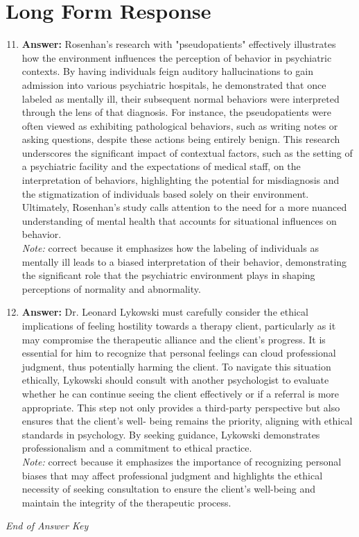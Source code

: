 \documentclass[12pt]{article}
\begin{document}
\section*{Long Form Response}
\begin{enumerate}[label=\arabic*.]
\setcounter{enumi}{10}
\item \textbf{Answer:} Rosenhan's research with "pseudopatients" effectively illustrates how the environment influences the perception of behavior in psychiatric contexts. By having individuals feign auditory hallucinations to gain admission into various psychiatric hospitals, he demonstrated that once labeled as mentally ill, their subsequent normal behaviors were interpreted through the lens of that diagnosis. For instance, the pseudopatients were often viewed as exhibiting pathological behaviors, such as writing notes or asking questions, despite these actions being entirely benign. This research underscores the significant impact of contextual factors, such as the setting of a psychiatric facility and the expectations of medical staff, on the interpretation of behaviors, highlighting the potential for misdiagnosis and the stigmatization of individuals based solely on their environment. Ultimately, Rosenhan's study calls attention to the need for a more nuanced understanding of mental health that accounts for situational influences on behavior.
\\ \textit{Note:} correct because it emphasizes how the labeling of individuals as mentally ill leads to a biased interpretation of their behavior, demonstrating the significant role that the psychiatric environment plays in shaping perceptions of normality and abnormality.
\item \textbf{Answer:} Dr. Leonard Lykowski must carefully consider the ethical implications of feeling hostility towards a therapy client, particularly as it may compromise the therapeutic alliance and the client's progress. It is essential for him to recognize that personal feelings can cloud professional judgment, thus potentially harming the client. To navigate this situation ethically, Lykowski should consult with another psychologist to evaluate whether he can continue seeing the client effectively or if a referral is more appropriate. This step not only provides a third-party perspective but also ensures that the client's well- being remains the priority, aligning with ethical standards in psychology. By seeking guidance, Lykowski demonstrates professionalism and a commitment to ethical practice.
\\ \textit{Note:} correct because it emphasizes the importance of recognizing personal biases that may affect professional judgment and highlights the ethical necessity of seeking consultation to ensure the client's well-being and maintain the integrity of the therapeutic process.
\end{enumerate}

\vfill
\noindent\textit{End of Answer Key}
\end{document}
